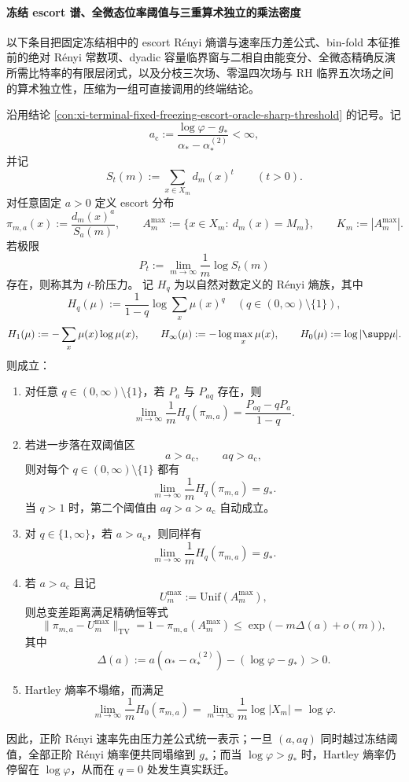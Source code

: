 \paragraph{冻结 escort 谱、全微态位率阈值与三重算术独立的乘法密度}
以下条目把固定冻结相中的 escort Rényi 熵谱与速率压力差公式、bin-fold 本征推前的绝对 Rényi 常数项、dyadic 容量临界窗与二相自由能变分、全微态精确反演所需比特率的有限层闭式，以及分枝三次场、零温四次场与 RH 临界五次场之间的算术独立性，压缩为一组可直接调用的终端结论。

\begin{theorem}[escort Rényi 速率的压力差公式、双阈值塌缩与 \texorpdfstring{$q=0$}{q=0} 跃迁]\label{thm:xi-fixed-freezing-escort-renyi-spectrum-collapse}
沿用结论 \ref{con:xi-terminal-fixed-freezing-escort-oracle-sharp-threshold} 的记号。记
\[
a_{\mathrm c}:=\frac{\log\varphi-g_*}{\alpha_*-\alpha_*^{(2)}}<\infty,
\]
并记
\[
S_t(m):=\sum_{x\in X_m}d_m(x)^t
\qquad (t>0).
\]
对任意固定 \(a>0\) 定义 escort 分布
\[
\pi_{m,a}(x):=\frac{d_m(x)^a}{S_a(m)},
\qquad
A_m^{\max}:=\{x\in X_m:\ d_m(x)=M_m\},
\qquad
K_m:=|A_m^{\max}|.
\]
若极限
\[
P_t:=\lim_{m\to\infty}\frac1m\log S_t(m)
\]
存在，则称其为 \(t\)-阶压力。
记 \(H_q\) 为以自然对数定义的 Rényi 熵族，其中
\[
H_q(\mu):=\frac{1}{1-q}\log\sum_x \mu(x)^q\quad(q\in(0,\infty)\setminus\{1\}),
\]
\[
H_1(\mu):=-\sum_x \mu(x)\log\mu(x),
\qquad
H_\infty(\mu):=-\log\max_x \mu(x),
\qquad
H_0(\mu):=\log|\supp \mu|.
\]
则成立：
\begin{enumerate}
  \item 对任意 \(q\in(0,\infty)\setminus\{1\}\)，若 \(P_a\) 与 \(P_{aq}\) 存在，则
  \[
  \boxed{\;
  \lim_{m\to\infty}\frac1m H_q(\pi_{m,a})
  =
  \frac{P_{aq}-qP_a}{1-q}.\;}
  \]
  \item 若进一步落在双阈值区
  \[
  a>a_{\mathrm c},
  \qquad
  aq>a_{\mathrm c},
  \]
  则对每个 \(q\in(0,\infty)\setminus\{1\}\) 都有
  \[
  \lim_{m\to\infty}\frac1m H_q(\pi_{m,a})=g_*.
  \]
  当 \(q>1\) 时，第二个阈值由 \(aq>a>a_{\mathrm c}\) 自动成立。
  \item 对 \(q\in\{1,\infty\}\)，若 \(a>a_{\mathrm c}\)，则同样有
  \[
  \lim_{m\to\infty}\frac1m H_q(\pi_{m,a})=g_*.
  \]
  \item 若 \(a>a_{\mathrm c}\) 且记
  \[
  U_m^{\max}:=\mathrm{Unif}(A_m^{\max}),
  \]
  则总变差距离满足精确恒等式
  \[
  \boxed{\;
  \|\pi_{m,a}-U_m^{\max}\|_{\mathrm{TV}}
  =
  1-\pi_{m,a}(A_m^{\max})
  \le
  \exp\!\bigl(-m\Delta(a)+o(m)\bigr),\;}
  \]
  其中
  \[
  \Delta(a):=a(\alpha_*-\alpha_*^{(2)})-(\log\varphi-g_*)>0.
  \]
  \item Hartley 熵率不塌缩，而满足
  \[
  \boxed{\;
  \lim_{m\to\infty}\frac1m H_0(\pi_{m,a})
  =
  \lim_{m\to\infty}\frac1m\log|X_m|
  =
  \log\varphi.\;}
  \]
\end{enumerate}
因此，正阶 Rényi 速率先由压力差公式统一表示；一旦 \((a,aq)\) 同时越过冻结阈值，全部正阶 Rényi 熵率便共同塌缩到 \(g_*\)；而当 \(\log\varphi>g_*\) 时，Hartley 熵率仍停留在 \(\log\varphi\)，从而在 \(q=0\) 处发生真实跃迁。
\end{theorem}
